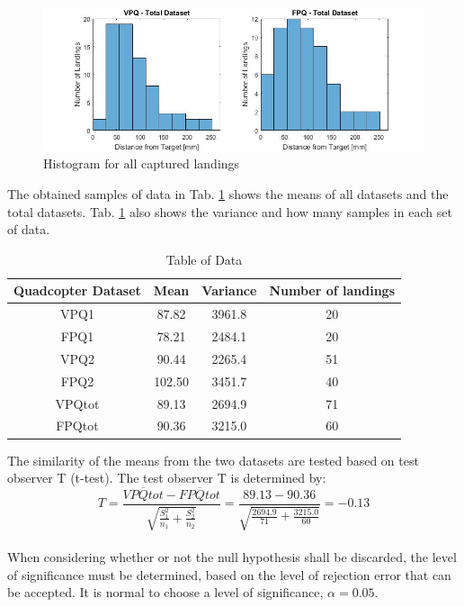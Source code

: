 \begin{figure}[H]
    \centering
    \includegraphics[width = 1\textwidth]{VAPIQ-PICTURES/histoall}
    \caption{Histogram for all captured landings}
    \label{fig:histo2}
\end{figure}

The obtained samples of data in Tab. \ref{tab:landingdata} shows the means of all datasets and the total datasets. Tab. \ref{tab:landingdata} also shows the variance and how many samples in each set of data.

\begin{table}[H]
\caption{Table of Data}
\label{tab:landingdata}
\centering
\begin{tabular}{| c | c |c| c|} 
  \hline
  Quadcopter Dataset   & Mean & Variance & Number of landings \\
 \hline
 VPQ1 & 87.82 & 3961.8   & 20\\
 FPQ1 & 78.21 & 2484.1   & 20\\
 VPQ2 & 90.44 & 2265.4   & 51\\
 FPQ2 & 102.50  & 3451.7  & 40\\
  \hline
 VPQtot & 89.13 & 2694.9   & 71\\
 FPQtot & 90.36 & 3215.0   & 60\\
 \hline
\end{tabular}
\end{table}

The similarity of the means from the two datasets are tested based on test observer T (t-test). The test observer T is determined by:\\
\begin{equation}
\label{eq:T}
  T = \frac{\overline{VPQtot} - \overline{FPQtot}}{\sqrt{\frac{S_1^2}{n_1}+\frac{S_2^2}{n_2}}} = \frac{89.13-90.36}{\sqrt{ \frac{2694.9}{71}+\frac{3215.0}{60} }} = -0.13
\end{equation}
\\
When considering whether or not the null hypothesis shall be discarded, the level of significance must be determined, based on the level of rejection error that can be accepted. It is normal to choose a level of significance, $\alpha=0.05$. \bigskip

